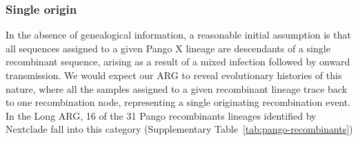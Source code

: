 \documentclass{article}
\begin{document}




\subsubsection{Single origin}
In the absence of genealogical information, a reasonable initial assumption is
that all sequences
assigned to a given Pango X lineage are descendants of a single recombinant
sequence, arising as a result of a mixed infection followed by onward
transmission. We would expect our ARG to reveal evolutionary histories of this
nature, where all the samples assigned to a given recombinant lineage
trace back to one recombination node, representing a single originating
recombination event. In the Long ARG, 16 of the 31 Pango recombinants lineages identified by Nextclade
fall into this category (Supplementary Table~\ref{tab:pango-recombinants})
\end{document}
